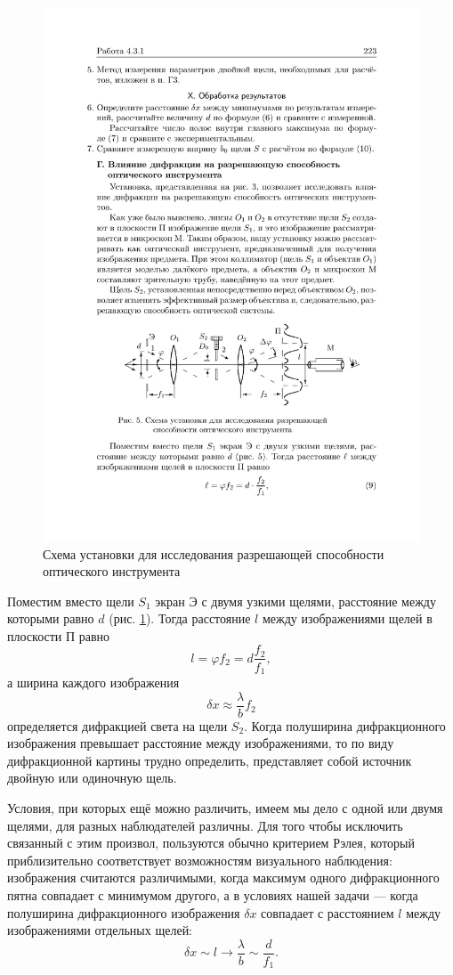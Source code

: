 \documentclass[a4paper, 12pt]{article}%
\begin{document}
\begin{figure}[h!]
	\centering
	\includegraphics[width=0.8\linewidth]{d.pdf}
	\caption{Схема установки для исследования разрешающей
		способности оптического инструмента}
	\label{labG}
\end{figure}

Поместим вместо щели $S_1$ экран Э с двумя узкими щелями, расстояние между которыми равно $d$ (рис. \ref{labG}). Тогда расстояние $l$ между изображениями щелей в плоскости П равно
\begin{equation}
	l = \varphi f_2 = d \dfrac{f_2}{f_1},
\end{equation}
а ширина каждого изображения
\begin{equation}
	\delta x \approx \dfrac{\lambda}{b} f_2
\end{equation}
определяется дифракцией света на щели $S_2$. Когда полуширина дифракционного изображения превышает расстояние между изображениями, то по виду дифракционной картины трудно определить, представляет собой источник двойную или одиночную щель.

Условия, при которых ещё можно различить, имеем мы дело с одной или двумя щелями, для разных наблюдателей различны. Для того чтобы исключить связанный с этим произвол, пользуются обычно критерием Рэлея, который приблизительно соответствует возможностям визуального наблюдения: изображения считаются различимыми, когда максимум одного дифракционного пятна совпадает с минимумом другого, а в условиях нашей задачи --- когда полуширина дифракционного изображения $\delta x$ совпадает с расстоянием $l$ между изображениями отдельных щелей:
\begin{equation}
	\delta x \sim l \to \dfrac{\lambda}{b} \sim \dfrac{d}{f_1}.
\end{equation}
\end{document}
